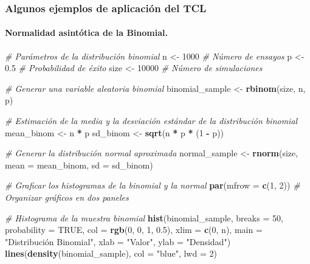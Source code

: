\documentclass[
]{article}
\newenvironment{Shaded}{\begin{snugshade}}{\end{snugshade}}
\newcommand{\AttributeTok}[1]{\textcolor[rgb]{0.13,0.29,0.53}{#1}}
\newcommand{\CommentTok}[1]{\textcolor[rgb]{0.56,0.35,0.01}{\textit{#1}}}
\newcommand{\ConstantTok}[1]{\textcolor[rgb]{0.56,0.35,0.01}{#1}}
\newcommand{\DecValTok}[1]{\textcolor[rgb]{0.00,0.00,0.81}{#1}}
\newcommand{\FloatTok}[1]{\textcolor[rgb]{0.00,0.00,0.81}{#1}}
\newcommand{\FunctionTok}[1]{\textcolor[rgb]{0.13,0.29,0.53}{\textbf{#1}}}
\newcommand{\NormalTok}[1]{#1}
\newcommand{\OtherTok}[1]{\textcolor[rgb]{0.56,0.35,0.01}{#1}}
\newcommand{\SpecialCharTok}[1]{\textcolor[rgb]{0.81,0.36,0.00}{\textbf{#1}}}
\newcommand{\StringTok}[1]{\textcolor[rgb]{0.31,0.60,0.02}{#1}}
\begin{document}
\subsubsection{Algunos ejemplos de aplicación del TCL}\label{algunos-ejemplos-de-aplicaciuxf3n-del-tcl}

\paragraph{Normalidad asintótica de la Binomial.}\label{normalidad-asintuxf3tica-de-la-binomial.}

\begin{Shaded}
\begin{Highlighting}[]
\CommentTok{\# Parámetros de la distribución binomial}
\NormalTok{n }\OtherTok{\textless{}{-}} \DecValTok{1000}  \CommentTok{\# Número de ensayos}
\NormalTok{p }\OtherTok{\textless{}{-}} \FloatTok{0.5}   \CommentTok{\# Probabilidad de éxito}
\NormalTok{size }\OtherTok{\textless{}{-}} \DecValTok{10000}  \CommentTok{\# Número de simulaciones}

\CommentTok{\# Generar una variable aleatoria binomial}
\NormalTok{binomial\_sample }\OtherTok{\textless{}{-}} \FunctionTok{rbinom}\NormalTok{(size, n, p)}

\CommentTok{\# Estimación de la media y la desviación estándar de la distribución binomial}
\NormalTok{mean\_binom }\OtherTok{\textless{}{-}}\NormalTok{ n }\SpecialCharTok{*}\NormalTok{ p}
\NormalTok{sd\_binom }\OtherTok{\textless{}{-}} \FunctionTok{sqrt}\NormalTok{(n }\SpecialCharTok{*}\NormalTok{ p }\SpecialCharTok{*}\NormalTok{ (}\DecValTok{1} \SpecialCharTok{{-}}\NormalTok{ p))}

\CommentTok{\# Generar la distribución normal aproximada}
\NormalTok{normal\_sample }\OtherTok{\textless{}{-}} \FunctionTok{rnorm}\NormalTok{(size, }\AttributeTok{mean =}\NormalTok{ mean\_binom, }\AttributeTok{sd =}\NormalTok{ sd\_binom)}

\CommentTok{\# Graficar los histogramas de la binomial y la normal}
\FunctionTok{par}\NormalTok{(}\AttributeTok{mfrow =} \FunctionTok{c}\NormalTok{(}\DecValTok{1}\NormalTok{, }\DecValTok{2}\NormalTok{))  }\CommentTok{\# Organizar gráficos en dos paneles}

\CommentTok{\# Histograma de la muestra binomial}
\FunctionTok{hist}\NormalTok{(binomial\_sample, }\AttributeTok{breaks =} \DecValTok{50}\NormalTok{, }\AttributeTok{probability =} \ConstantTok{TRUE}\NormalTok{, }
     \AttributeTok{col =} \FunctionTok{rgb}\NormalTok{(}\DecValTok{0}\NormalTok{, }\DecValTok{0}\NormalTok{, }\DecValTok{1}\NormalTok{, }\FloatTok{0.5}\NormalTok{), }\AttributeTok{xlim =} \FunctionTok{c}\NormalTok{(}\DecValTok{0}\NormalTok{, n), }
     \AttributeTok{main =} \StringTok{"Distribución Binomial"}\NormalTok{, }\AttributeTok{xlab =} \StringTok{"Valor"}\NormalTok{, }
     \AttributeTok{ylab =} \StringTok{"Densidad"}\NormalTok{)}
\FunctionTok{lines}\NormalTok{(}\FunctionTok{density}\NormalTok{(binomial\_sample), }\AttributeTok{col =} \StringTok{"blue"}\NormalTok{, }\AttributeTok{lwd =} \DecValTok{2}\NormalTok{)}


\end{Highlighting}
\end{Shaded}
\end{document}
